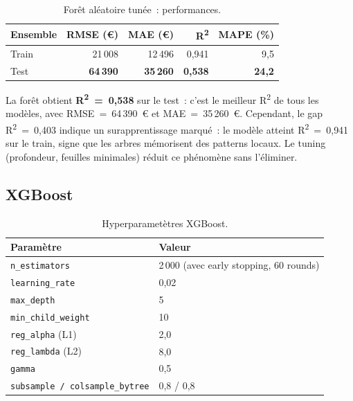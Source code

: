 \documentclass[12pt,a4paper]{article}
\begin{document}
\begin{table}[H]
\centering
\caption{For\^et al\'eatoire tun\'ee~: performances.}
\label{tab:rf}
\begin{tabular}{lrrrr}
\toprule
\textbf{Ensemble} & \textbf{RMSE (\euro)} & \textbf{MAE (\euro)} & \textbf{R\textsuperscript{2}} & \textbf{MAPE (\%)} \\
\midrule
Train & 21\,008 & 12\,496 & 0{,}941 & \phantom{0}9{,}5 \\
Test  & \textbf{64\,390} & \textbf{35\,260} & \textbf{0{,}538} & \textbf{24{,}2} \\
\bottomrule
\end{tabular}
\end{table}

\begin{descrbox}
La for\^et obtient \textbf{R\textsuperscript{2}~=~0{,}538} sur le test~: c'est le meilleur R\textsuperscript{2} de tous les mod\`eles, avec RMSE~=~64\,390~\euro{} et MAE~=~35\,260~\euro. Cependant, le gap R\textsuperscript{2}~=~0{,}403 indique un surapprentissage marqu\'e~: le mod\`ele atteint R\textsuperscript{2}~=~0{,}941 sur le train, signe que les arbres m\'emorisent des patterns locaux. Le tuning (profondeur, feuilles minimales) r\'eduit ce ph\'enom\`ene sans l'\'eliminer.
\end{descrbox}

\subsection{XGBoost}

\begin{table}[H]
\centering
\caption{Hyperparamet\`etres XGBoost.}
\label{tab:xgb_params}
\small
\begin{tabular}{ll}
\toprule
\textbf{Param\`etre} & \textbf{Valeur} \\
\midrule
\texttt{n\_estimators} & 2\,000 (avec early stopping, 60 rounds) \\
\texttt{learning\_rate} & 0{,}02 \\
\texttt{max\_depth} & 5 \\
\texttt{min\_child\_weight} & 10 \\
\texttt{reg\_alpha} (L1) & 2{,}0 \\
\texttt{reg\_lambda} (L2) & 8{,}0 \\
\texttt{gamma} & 0{,}5 \\
\texttt{subsample / colsample\_bytree} & 0{,}8 / 0{,}8 \\
\bottomrule
\end{tabular}
\end{table}
\end{document}
